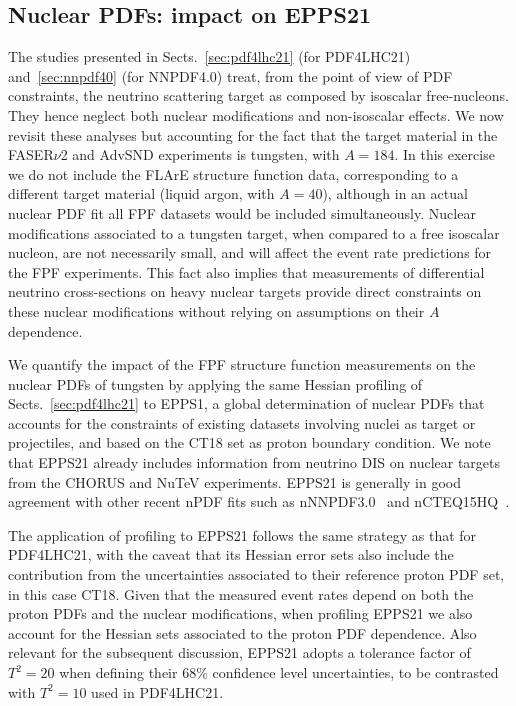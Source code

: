 \subsection{Nuclear PDFs: impact on EPPS21}
\label{sec:nuclearPDFs}

The studies presented in Sects.~\ref{sec:pdf4lhc21} (for PDF4LHC21)
and~\ref{sec:nnpdf40} (for NNPDF4.0) treat, from the point of view
of PDF constraints, the neutrino scattering target
as composed by isoscalar free-nucleons.
%
They hence neglect both nuclear modifications and non-isoscalar effects.
%
We now revisit these analyses but accounting for the fact that the target material
in the FASER$\nu$2 and AdvSND experiments is tungsten, with $A=184$.
%
In this exercise we do not include the FLArE structure function data,
corresponding to a different target material (liquid argon, with $A=40$), although
in an actual nuclear PDF fit all FPF datasets would be included simultaneously.
%
Nuclear modifications associated to a tungsten target, when compared
to a free isoscalar nucleon, are not necessarily small, and  will affect the event rate predictions for
the FPF experiments.
%
This fact also implies that  measurements of differential neutrino cross-sections
on heavy nuclear targets provide direct constraints on these nuclear modifications
without relying on assumptions on their $A$ dependence.

We quantify the impact of the FPF structure function measurements
on the nuclear PDFs of tungsten by applying the same Hessian profiling
of Sects.~\ref{sec:pdf4lhc21} to EPPS1, a global determination of nuclear PDFs
that accounts for the constraints of existing datasets involving nuclei as target or projectiles,
and based on the CT18 set as proton boundary condition.
%
We note that EPPS21 already includes information from neutrino DIS on nuclear targets
from the CHORUS and NuTeV experiments.
%
EPPS21 is generally in good agreement with other recent nPDF fits such as nNNPDF3.0~\cite{AbdulKhalek:2022fyi}
and nCTEQ15HQ~\cite{Duwentaster:2022kpv}.

The application of profiling to EPPS21 follows the same strategy as that
for PDF4LHC21, with the caveat that its Hessian error sets also include the contribution
from the uncertainties  associated to their reference proton PDF set, in this case CT18.
%
Given that the measured event rates depend on both the proton PDFs and the nuclear modifications,
when profiling EPPS21 we also account for the Hessian sets associated to the proton
PDF dependence.
%
Also relevant for the subsequent discussion, EPPS21 adopts a tolerance
factor of $T^2 = 20$ when defining their  68\%  confidence level uncertainties,
to be contrasted with  $T^2 = 10$ used in PDF4LHC21.
 
